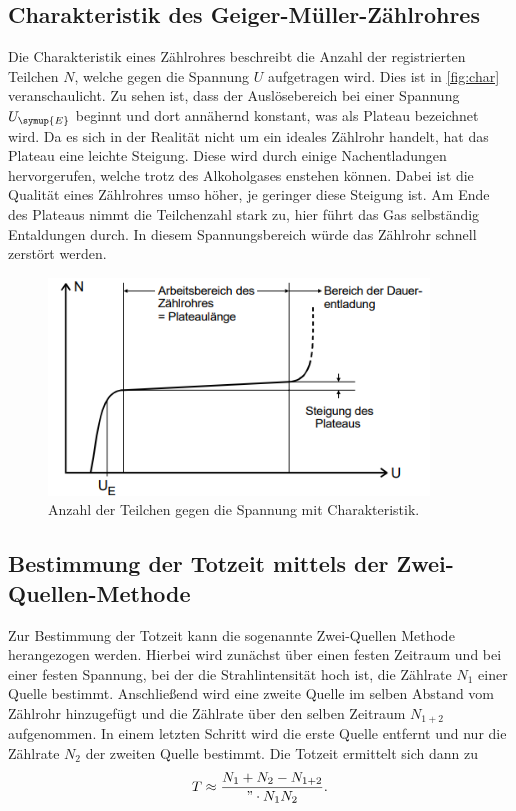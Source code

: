 \subsection{Charakteristik des Geiger-Müller-Zählrohres}
Die Charakteristik eines Zählrohres beschreibt die Anzahl der registrierten Teilchen $N$, welche gegen die Spannung $U$ aufgetragen wird.
Dies ist in \autoref{fig:char} veranschaulicht. Zu sehen ist, dass der Auslösebereich bei einer Spannung $U_{\symup{E}}$ beginnt und dort
annähernd konstant, was als Plateau bezeichnet wird. Da es sich in der Realität nicht um ein ideales Zählrohr handelt, hat das Plateau
eine leichte Steigung. Diese wird durch einige Nachentladungen hervorgerufen, welche trotz des Alkoholgases enstehen können. Dabei
ist die Qualität eines Zählrohres umso höher, je geringer diese Steigung ist. Am Ende des Plateaus nimmt die Teilchenzahl stark zu, hier
führt das Gas selbständig Entaldungen durch.
In diesem Spannungsbereich würde das Zählrohr schnell zerstört werden.
\begin{figure}
    \centering
    \includegraphics[width=0.9\textwidth]{content/charakteristik.png}
    \caption{Anzahl der Teilchen gegen die Spannung mit Charakteristik.}
    \label{fig:char}
\end{figure}
\subsection{Bestimmung der Totzeit mittels der Zwei-Quellen-Methode}
Zur Bestimmung der Totzeit kann die sogenannte Zwei-Quellen Methode herangezogen werden. Hierbei wird zunächst über einen festen
Zeitraum und bei einer festen Spannung, bei der die Strahlintensität hoch ist, die Zählrate $N_1$ einer Quelle bestimmt. Anschließend wird eine
zweite Quelle im selben Abstand vom Zählrohr hinzugefügt und die Zählrate über den selben Zeitraum $N_{1+2}$ aufgenommen. In einem letzten
Schritt wird die erste Quelle entfernt und nur die Zählrate $N_2$ der zweiten Quelle bestimmt. Die Totzeit ermittelt sich dann zu
\begin{equation}
\label{eqn:totzeit}
T \approx \frac{N_1 + N_2 - N_{1+2}}{"\cdot N_1 N_2}.
\end{equation}
